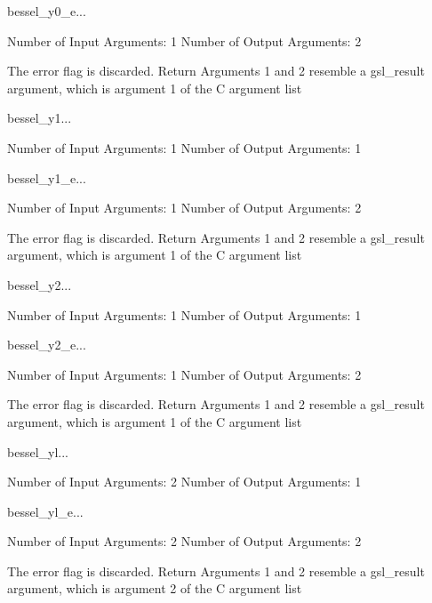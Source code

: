 \begin{funcdesc}{bessel_y0_e}{...}

    Number of Input  Arguments:  1
    Number of Output Arguments:  2

The error flag is discarded.
Return Arguments 1 and 2 resemble a gsl_result argument,
	which is  argument 1 of the C argument list

\end{funcdesc}

\begin{funcdesc}{bessel_y1}{...}

    Number of Input  Arguments:  1
    Number of Output Arguments:  1
\end{funcdesc}

\begin{funcdesc}{bessel_y1_e}{...}

    Number of Input  Arguments:  1
    Number of Output Arguments:  2

The error flag is discarded.
Return Arguments 1 and 2 resemble a gsl_result argument,
	which is  argument 1 of the C argument list

\end{funcdesc}

\begin{funcdesc}{bessel_y2}{...}

    Number of Input  Arguments:  1
    Number of Output Arguments:  1
\end{funcdesc}

\begin{funcdesc}{bessel_y2_e}{...}

    Number of Input  Arguments:  1
    Number of Output Arguments:  2

The error flag is discarded.
Return Arguments 1 and 2 resemble a gsl_result argument,
	which is  argument 1 of the C argument list

\end{funcdesc}

\begin{funcdesc}{bessel_yl}{...}

    Number of Input  Arguments:  2
    Number of Output Arguments:  1
\end{funcdesc}

\begin{funcdesc}{bessel_yl_e}{...}

    Number of Input  Arguments:  2
    Number of Output Arguments:  2

The error flag is discarded.
Return Arguments 1 and 2 resemble a gsl_result argument,
	which is  argument 2 of the C argument list

\end{funcdesc}

